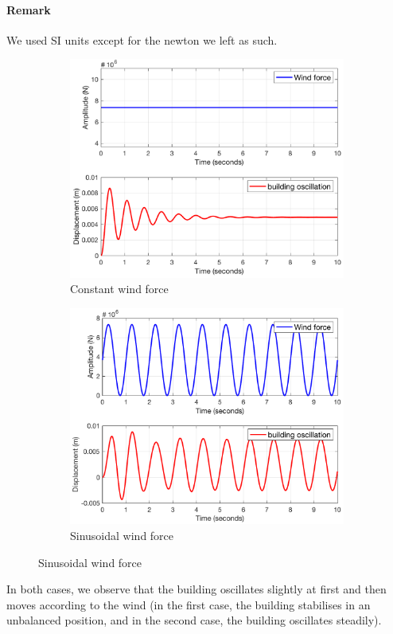 \documentclass[a4paper, 12pt]{article}
\begin{document}
    \paragraph{Remark} We used SI units except for the newton we left as such.
    \begin{figure}[H]
        \centering
        \begin{subfigure}{0.495\textwidth}
            \includegraphics[width=\textwidth]{resources/pdf/constant.pdf}
            \caption{Constant wind force}
        \end{subfigure}
        \begin{subfigure}{0.495\textwidth}
            \includegraphics[width=\textwidth]{resources/pdf/sinusoidal.pdf}
            \caption{Sinusoidal wind force}
        \end{subfigure}
        \label{fig:simulations}
    \end{figure}
    In both cases, we observe that the building oscillates slightly at first and then moves according to the wind (in the first case, the building stabilises in an unbalanced position, and in the second case, the building oscillates steadily).
    
\end{document}

